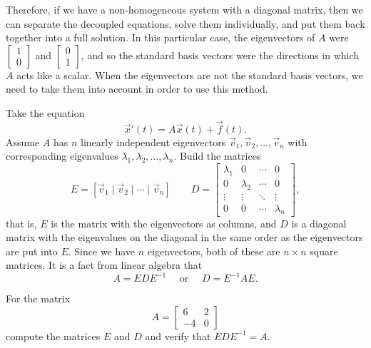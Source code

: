 \documentclass{ximera}
\begin{document}
Therefore, if we have a non-homogeneous system with a diagonal matrix, then we can separate the decoupled equations, solve them individually, and put them back together into a full solution. In this particular case, the eigenvectors of $A$ were $\begin{bmatrix} 1 \\ 0 \end{bmatrix}$ and $\begin{bmatrix} 0 \\ 1 \end{bmatrix}$, and so the standard basis vectors were the directions in which $A$ acts like a scalar. When the eigenvectors are not the standard basis vectors, we need to take them into account in order to use this method.

Take the equation
\begin{equation} \label{nhsys:ednhsys}
    {\vec{x}}' (t) = A \vec{x}(t) + \vec{f}(t) .
\end{equation}
Assume $A$ has $n$ linearly independent eigenvectors $\vec{v}_1, \vec{v}_2, \ldots, \vec{v}_n$ with corresponding eigenvalues $\lambda_1, \lambda_2, \ldots, \lambda_n$. Build the matrices 
\begin{equation*}
    E = \left[ \vec{v}_1 \mid \vec{v}_2 \mid \cdots \mid \vec{v}_n \right] \qquad D = \begin{bmatrix} \lambda_1 & 0 & \cdots & 0 \\ 0 & \lambda_2 & \cdots & 0 \\ \vdots & \vdots & \ddots & \vdots \\ 0 & 0 & \cdots & \lambda_n \end{bmatrix},
\end{equation*}
that is, $E$ is the matrix with the eigenvectors as columns, and $D$ is a diagonal matrix with the eigenvalues on the diagonal in the same order as the eigenvectors are put into $E$. Since we have $n$ eigenvectors, both of these are $n \times n$ square matrices. It is a fact from linear algebra that
\begin{equation*}
    A = EDE^{-1} \quad \text{ or } \quad D = E^{-1}AE.
\end{equation*}

\begin{exercise}
    For the matrix 
    \begin{equation*}
        A = \begin{bmatrix} 6 & 2 \\ -4 & 0 \end{bmatrix}
    \end{equation*}
    compute the matrices $E$ and $D$ and verify that $EDE^{-1} = A$. 
\end{exercise}
\end{document}
